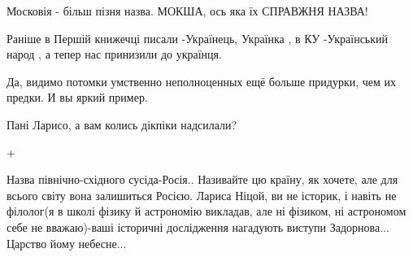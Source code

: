 \begin{itemize}
Московія - більш пізня назва. МОКША, ось яка їх СПРАВЖНЯ НАЗВА!


 
Раніше в Першій книжечці писали -Українець, Українка , в КУ -Український народ , а тепер нас принизили до українця.

 
Да, видимо потомки умственно неполноценных ещё больше придурки, чем их предки. И вы яркий пример.

 
Пані Ларисо, а вам колись дікпіки надсилали?

 
+

 

Назва північно-східного сусіда-Росія.. Називайте цю країну, як хочете, але для
всього світу вона залишиться Росією. Лариса Ніцой, ви не історик, і навіть не
філолог(я в школі фізику й астрономію викладав, але ні фізиком, ні астрономом
себе не вважаю)-ваші історичні дослідження нагадують виступи Задорнова...
Царство йому небесне...

\begin{itemize}
 

\end{itemize}
\end{itemize}

